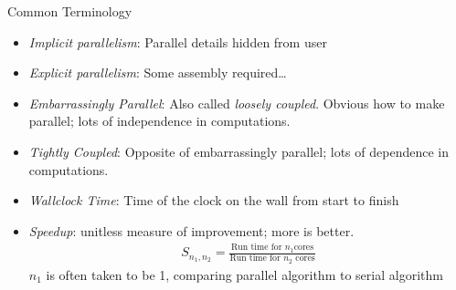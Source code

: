 

\begin{frame}
  \begin{block}{Common Terminology}
    \begin{itemize}[<+-|alert@+>]
    \item \emph{Implicit parallelism}:  Parallel details hidden from user
    \item \emph{Explicit parallelism}:  Some assembly required\dots
    \item \emph{Embarrassingly Parallel}:  Also called \emph{loosely coupled}.  
      Obvious how to make parallel; lots of independence in computations.
    \item \emph{Tightly Coupled}:  Opposite of embarrassingly
      parallel; lots of dependence in computations.
    \item \emph{Wallclock Time}:  Time of the clock on the wall from
      start to finish
    \item \emph{Speedup}:  unitless measure of improvement; more is
      better. 
      \begin{align*}
        S_{n_1, n_2} =  \frac{\text{Run time for } n_1 \text{
        cores}}{\text{Run time  
        for } n_2 \text{ cores}}
      \end{align*}
      $n_1$ is often taken to be 1, comparing parallel algorithm to
      serial algorithm 
  \end{itemize}
  \end{block}
\end{frame}


